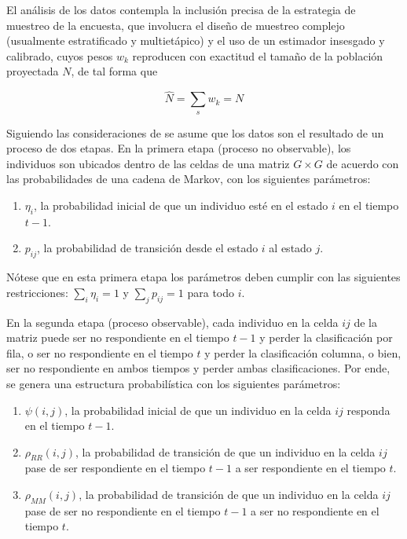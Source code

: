 \documentclass[
  10pt,
  spanish,
]{book}
\providecommand{\tightlist}{%
  \setlength{\itemsep}{0pt}\setlength{\parskip}{0pt}}
\begin{document}
El análisis de los datos contempla la inclusión precisa de la estrategia de muestreo de la encuesta, que involucra el diseño de muestreo complejo (usualmente estratificado y multietápico) y el uso de un estimador insesgado y calibrado, cuyos pesos \(w_k\) reproducen con exactitud el tamaño de la población proyectada \(N\), de tal forma que

\[
\hat{N}=\sum_s w_k  = N
\]

Siguiendo las consideraciones de \citet{Feinberg_Stasny_1983} se asume que los datos son el resultado de un proceso de dos etapas. En la primera etapa (proceso no observable), los individuos son ubicados dentro de las celdas de una matriz \(G\times G\) de acuerdo con las probabilidades de una cadena de Markov, con los siguientes parámetros:

\begin{enumerate}
\def\labelenumi{\arabic{enumi}.}
\tightlist
\item
  \(\eta_i\), la probabilidad inicial de que un individuo esté en el estado \(i\) en el tiempo \(t-1\).
\item
  \(p_{ij}\), la probabilidad de transición desde el estado \(i\) al estado \(j\).
\end{enumerate}

Nótese que en esta primera etapa los parámetros deben cumplir con las siguientes restricciones: \(\sum_i\eta_i=1\) y \(\sum_jp_{ij}=1\) para todo \(i\).

En la segunda etapa (proceso observable), cada individuo en la celda \(ij\) de la matriz puede ser no respondiente en el tiempo \(t-1\) y perder la clasificación por fila, o ser no respondiente en el tiempo \(t\) y perder la clasificación columna, o bien, ser no respondiente en ambos tiempos y perder ambas clasificaciones. Por ende, se genera una estructura probabilística con los siguientes parámetros:

\begin{enumerate}
\def\labelenumi{\arabic{enumi}.}
\tightlist
\item
  \(\psi(i,j)\), la probabilidad inicial de que un individuo en la celda \(ij\) responda en el tiempo \(t-1\).
\item
  \(\rho_{RR}(i,j)\), la probabilidad de transición de que un individuo en la celda \(ij\) pase de ser respondiente en el tiempo \(t-1\) a ser respondiente en el tiempo \(t\).
\item
  \(\rho_{MM}(i,j)\), la probabilidad de transición de que un individuo en la celda \(ij\) pase de ser no respondiente en el tiempo \(t-1\) a ser no respondiente en el tiempo \(t\).
\end{enumerate}
\end{document}
